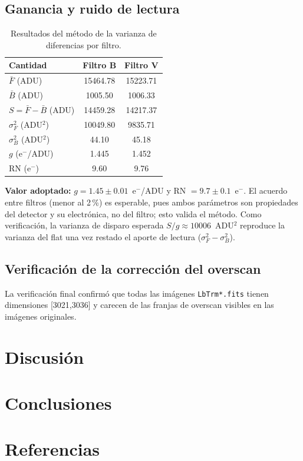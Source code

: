 \documentclass[10pt,a4paper,twocolumn]{article}
\begin{document}
\subsection{Ganancia y ruido de lectura}
\begin{table}[ht]
\centering
\caption{Resultados del método de la varianza de diferencias por filtro.}
\label{tab:ganancia}
\begin{tabular}{lcc}
\toprule
Cantidad & Filtro B & Filtro V \\
\midrule
$\bar{F}$ (ADU)              & 15464.78 & 15223.71 \\
$\bar{B}$ (ADU)              & 1005.50  & 1006.33  \\
$S=\bar{F}-\bar{B}$ (ADU)    & 14459.28 & 14217.37 \\
$\sigma^2_F$ (ADU$^2$)       & 10049.80 & 9835.71  \\
$\sigma^2_B$ (ADU$^2$)       & 44.10    & 45.18    \\
\midrule
$g$ (e$^-$/ADU)              & 1.445    & 1.452    \\
RN (e$^-$)                   & 9.60     & 9.76     \\
\bottomrule
\end{tabular}
\end{table}

\noindent\textbf{Valor adoptado:} $g = 1.45 \pm 0.01$~e$^-$/ADU y
RN $= 9.7 \pm 0.1$~e$^-$. El acuerdo entre filtros (menor al 2\,\%) es
esperable, pues ambos parámetros son propiedades del detector y su
electrónica, no del filtro; esto valida el método. Como verificación, la
varianza de disparo esperada $S/g \approx 10006$~ADU$^2$ reproduce la
varianza del flat una vez restado el aporte de lectura ($\sigma^2_F -
\sigma^2_B$).

\subsection{Verificación de la corrección del overscan}
\noindent La verificación final confirmó que todas las imágenes
\texttt{LbTrm*.fits} tienen dimensiones [3021,3036] y carecen de las
franjas de overscan visibles en las imágenes originales.

\section{Discusión}

\section{Conclusiones}

\section*{Referencias}
\end{document}
